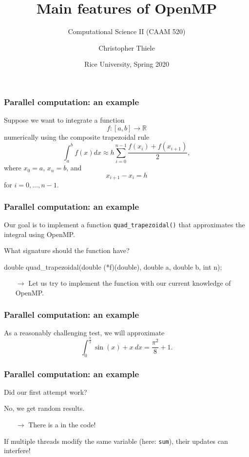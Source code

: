 \documentclass[12pt,t]{beamer}
\let\emph\relax %
\newcommand{\conclude}[1]{%
  \begin{itemize}
    \item[$\rightarrow$]#1
  \end{itemize}
}
\begin{document}
  \title{Main features of OpenMP}
  \subtitle{Computational Science II (CAAM 520)}
  \author{Christopher Thiele}
  \date{Rice University, Spring 2020}

  \begin{frame}
    \titlepage
  \end{frame}


  \begin{frame}[fragile]
    \frametitle{Parallel computation: an example}

    Suppose we want to integrate a function
    \[f:\left[a,b\right]\rightarrow\mathbb R\]
    numerically using the composite trapezoidal rule
    \[\int_a^b f(x)dx\approx h\sum_{i=0}^{n-1}\frac{f(x_i)+f(x_{i+1})}2,\]
    where $x_0=a$, $x_n=b$, and
    \[x_{i+1}-x_i=h\]
    for $i=0,\ldots,n-1$.
  \end{frame}

  \begin{frame}[fragile]
    \frametitle{Parallel computation: an example}

    Our goal is to implement a function \texttt{quad\_trapezoidal()} that approximates the integral \emph{in parallel} using OpenMP.

    What signature should the function have?
    \pause
    \begin{code}
double quad_trapezoidal(double (*f)(double),
                        double a,
                        double b,
                        int n);
    \end{code}
    \conclude{Let us try to implement the function with our current knowledge of OpenMP.}
  \end{frame}

  \begin{frame}[fragile]
    \frametitle{Parallel computation: an example}

    As a reasonably challenging test, we will approximate
    \[\int_0^{\frac{\pi}2}\sin(x)+x\ dx=\frac{\pi^2}8+1.\]
  \end{frame}

  \begin{frame}[fragile]
    \frametitle{Parallel computation: an example}

    Did our first attempt work?

    No, we get random results.
    \conclude{There is a \emph{data race} in the code!}

    If multiple threads modify the same variable (here: \texttt{sum}), their updates can interfere!
  \end{frame}
\end{document}
